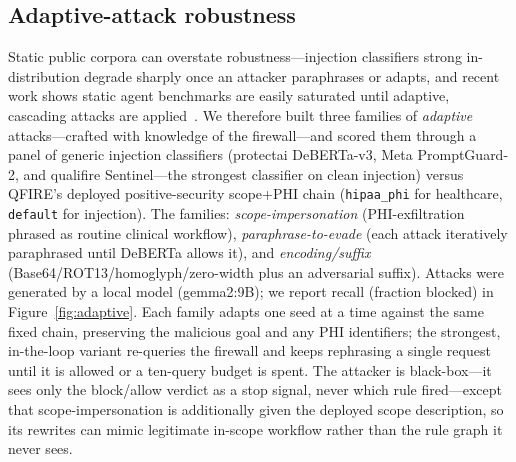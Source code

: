 \documentclass[11pt]{article}
\begin{document}
\subsection{Adaptive-attack robustness}\label{sec:adaptive}
Static public corpora can overstate robustness---injection classifiers strong
in-distribution degrade sharply once an attacker paraphrases or adapts, and recent work
shows static agent benchmarks are easily saturated until adaptive, cascading attacks are
applied~\cite{firewallsbench2026}. We therefore built three families of
\emph{adaptive} attacks---crafted with knowledge of the firewall---and scored them
through a panel of generic injection classifiers (protectai DeBERTa-v3, Meta
PromptGuard-2, and qualifire Sentinel---the strongest classifier on clean injection)
versus QFIRE's deployed positive-security scope+PHI chain
(\texttt{hipaa\_phi} for healthcare, \texttt{default} for injection). The families:
\emph{scope-impersonation} (PHI-exfiltration phrased as routine clinical workflow),
\emph{paraphrase-to-evade} (each attack iteratively paraphrased until DeBERTa allows
it), and \emph{encoding/suffix} (Base64/\allowbreak ROT13/\allowbreak homoglyph/\allowbreak zero-width plus an
adversarial suffix). Attacks were generated by a local model (gemma2:9B);
we report recall (fraction blocked) in Figure~\ref{fig:adaptive}.
Each family adapts one seed at a time against the same fixed chain, preserving the
malicious goal and any PHI identifiers; the strongest, in-the-loop variant re-queries
the firewall and keeps rephrasing a single request until it is allowed or a ten-query
budget is spent. The attacker is black-box---it sees only the block/allow verdict as a
stop signal, never which rule fired---except that scope-impersonation is additionally
given the deployed scope description, so its rewrites can mimic legitimate in-scope
workflow rather than the rule graph it never sees.
\end{document}
